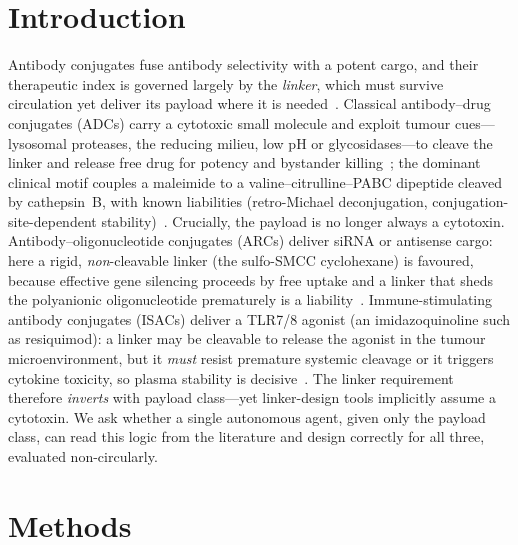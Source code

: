\documentclass[10pt]{article}
\begin{document}
\section{Introduction}
Antibody conjugates fuse antibody selectivity with a potent cargo, and their therapeutic index is governed largely by the \emph{linker}, which must survive circulation yet deliver its payload where it is needed~\cite{su2021,balamkundu2023}. Classical antibody--drug conjugates (ADCs) carry a cytotoxic small molecule and exploit tumour cues---lysosomal proteases, the reducing milieu, low pH or glycosidases---to cleave the linker and release free drug for potency and bystander killing~\cite{peng2021}; the dominant clinical motif couples a maleimide to a valine--citrulline--PABC dipeptide cleaved by cathepsin~B, with known liabilities (retro-Michael deconjugation, conjugation-site-dependent stability)~\cite{su2021,su2021zhang}.
Crucially, the payload is no longer always a cytotoxin. Antibody--oligonucleotide conjugates (ARCs) deliver siRNA or antisense cargo: here a rigid, \emph{non}-cleavable linker (the sulfo-SMCC cyclohexane) is favoured, because effective gene silencing proceeds by free uptake and a linker that sheds the polyanionic oligonucleotide prematurely is a liability~\cite{arc2025}. Immune-stimulating antibody conjugates (ISACs) deliver a TLR7/8 agonist (an imidazoquinoline such as resiquimod): a linker may be cleavable to release the agonist in the tumour microenvironment, but it \emph{must} resist premature systemic cleavage or it triggers cytokine toxicity, so plasma stability is decisive~\cite{isac2022,isac2023,isac2025}. The linker requirement therefore \emph{inverts} with payload class---yet linker-design tools implicitly assume a cytotoxin. We ask whether a single autonomous agent, given only the payload class, can read this logic from the literature and design correctly for all three, evaluated non-circularly.
\section{Methods}
\end{document}
